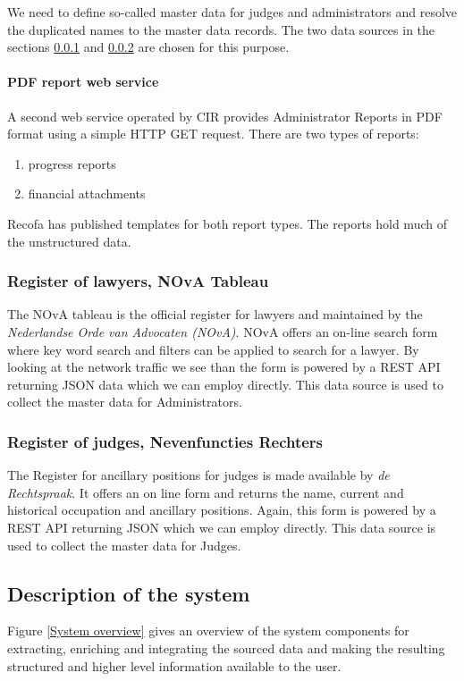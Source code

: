 We need to define so-called master data for judges and administrators and resolve the duplicated names to the master data records. The two data sources in the sections \ref{NOvA Tableau} and \ref{Nevenfuncties Rechters} are chosen for this purpose.

\paragraph{PDF report web service}
A second web service operated by CIR provides Administrator Reports in PDF format using a simple HTTP GET request. There are two types of reports: 
\begin{enumerate}
\item progress reports
\item financial attachments
\end{enumerate}
Recofa has published templates for both report types\cite{rechtspraak:3}. The reports hold much of the unstructured data.

\subsubsection{Register of lawyers, NOvA Tableau}\label{NOvA Tableau}

The NOvA tableau is the official register for lawyers and maintained by the \textit{Nederlandse Orde van Advocaten (NOvA)}\cite{nova:1}. NOvA offers an on-line search form where key word search and filters can be applied to search for a lawyer. By looking at the network traffic we see than the form is powered by a REST API returning JSON data which we can employ directly. This data source is used to collect the master data for Administrators.

\subsubsection{Register of judges, Nevenfuncties Rechters}\label{Nevenfuncties Rechters}

The Register for ancillary positions for judges is made available by \textit{de Rechtspraak}\cite{rechtspraak:2}. It offers an on line form and returns the name, current and historical occupation and ancillary positions. Again, this form is powered by a REST API returning JSON which we can employ directly. This data source is used to collect the master data for Judges.


\subsection{Description of the system}
Figure \ref{System overview} gives an overview of the system components for extracting, enriching and integrating the sourced data and making the resulting structured and higher level information available to the user.

